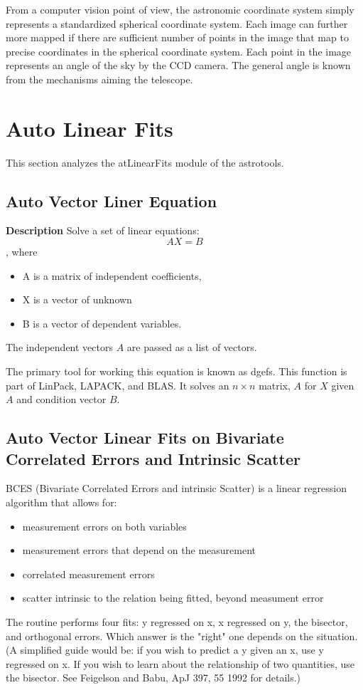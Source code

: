 \documentclass[11pt]{article}
\begin{document}
From a computer vision point of view, the astronomic coordinate system simply represents a standardized spherical coordinate system.  Each image can further more mapped if there are sufficient number of points in the image that map to precise coordinates in the spherical coordinate system.  Each point in the image represents an angle of the sky by the CCD camera.  The general angle is known from the mechanisms aiming the telescope.  

\section {Auto Linear Fits}
This section analyzes the atLinearFits module of the astrotools.  


\subsection{Auto Vector Liner Equation}

\textbf{Description} Solve a set of linear equations: 
\[ A X = B \]
, where \begin{itemize}
\item A is a matrix of independent coefficients, 
\item X is a vector of unknown
\item B is a vector of dependent variables. 
\end{itemize}
The independent vectors $A$ are passed as a list of vectors.

The primary tool for working this equation is known as dgefs.   This function is part of LinPack, LAPACK, and BLAS.  It solves an $n\times n$ matrix, $A$ for $X$ given $A$ and condition vector $B$.   

\subsection {Auto Vector Linear Fits on Bivariate Correlated Errors and Intrinsic Scatter}
BCES (Bivariate Correlated Errors and intrinsic Scatter) is a linear
  regression algorithm that allows for:
\begin{itemize}
\item measurement errors on both variables
\item measurement errors that depend on the measurement
\item correlated measurement errors
\item scatter intrinsic to the relation being fitted, beyond measument error
\end {itemize}
  The routine performs four fits: y regressed on x, x regressed on y, the bisector, and orthogonal errors. Which answer is the "right" one depends on the situation. (A simplified guide would be: if you wish to predict a y given an x, use y regressed on x. If you wish to learn about the relationship of two quantities, use the bisector. See Feigelson and Babu, ApJ 397, 55 1992 for details.)
\end{document}
